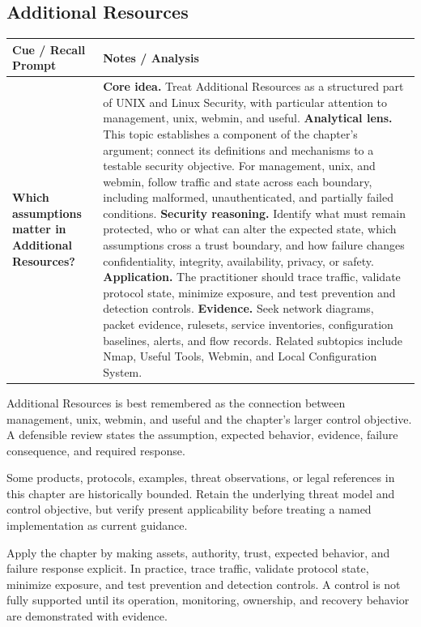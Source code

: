 \documentclass[11pt]{article}
\newcommand{\CornellHeader}{%
\rowcolor{Navy}\color{white}\bfseries Cue / Recall Prompt & \color{white}\bfseries Notes / Analysis\\\hline}
\newcommand{\CornellRow}[2]{%
\cellcolor{CueGray}\RaggedRight\textbf{#1} & \RaggedRight #2\\\hline}
\begin{document}
\subsection*{Additional Resources}
\begin{longtable}{>{\RaggedRight\arraybackslash}p{}|>{\RaggedRight\arraybackslash}p{}}
\CornellHeader
\CornellRow{Which assumptions matter in Additional Resources?}{\textbf{Core idea.} Treat Additional Resources as a structured part of UNIX and Linux Security, with particular attention to management, unix, webmin, and useful. \textbf{Analytical lens.} This topic establishes a component of the chapter's argument; connect its definitions and mechanisms to a testable security objective. For management, unix, and webmin, follow traffic and state across each boundary, including malformed, unauthenticated, and partially failed conditions. \textbf{Security reasoning.} Identify what must remain protected, who or what can alter the expected state, which assumptions cross a trust boundary, and how failure changes confidentiality, integrity, availability, privacy, or safety. \textbf{Application.} The practitioner should trace traffic, validate protocol state, minimize exposure, and test prevention and detection controls. \textbf{Evidence.} Seek network diagrams, packet evidence, rulesets, service inventories, configuration baselines, alerts, and flow records. Related subtopics include Nmap, Useful Tools, Webmin, and Local Configuration System.}
\end{longtable}
\begin{topicsummary}
Additional Resources is best remembered as the connection between management, unix, webmin, and useful and the chapter's larger control objective. A defensible review states the assumption, expected behavior, evidence, failure consequence, and required response.
\end{topicsummary}
\begin{historybox}
Some products, protocols, examples, threat observations, or legal references in this chapter are historically bounded. Retain the underlying threat model and control objective, but verify present applicability before treating a named implementation as current guidance.
\end{historybox}
\begin{defensebox}
Apply the chapter by making assets, authority, trust, expected behavior, and failure response explicit. In practice, trace traffic, validate protocol state, minimize exposure, and test prevention and detection controls. A control is not fully supported until its operation, monitoring, ownership, and recovery behavior are demonstrated with evidence.
\end{defensebox}
\end{document}
